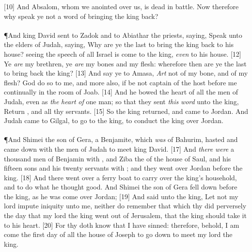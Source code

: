 [10] \textcolor[cmyk]{0.99998,1,0,0}{And Absalom, whom we anointed over us, is dead in battle. Now therefore why speak ye not a word of bringing the king back?}\\
\\
\P \textcolor[cmyk]{0.99998,1,0,0}{And king David sent to Zadok and to Abiathar the priests, saying, Speak unto the elders of Judah, saying, Why are ye the last to bring the king back to his house? seeing the speech of all Israel is come to the king, \emph{even} to his house.}
[12] \textcolor[cmyk]{0.99998,1,0,0}{Ye \emph{are} my brethren, ye \emph{are} my bones and my flesh: wherefore then are ye the last to bring back the king?}
[13] \textcolor[cmyk]{0.99998,1,0,0}{And say ye to Amasa, \emph{Art}  not of my bone, and of my flesh? God do so to me, and more also, if  be not captain of the host before me continually in the room of Joab.}
[14] \textcolor[cmyk]{0.99998,1,0,0}{And he bowed the heart of all the men of Judah, even as \emph{the} \emph{heart} \emph{of} one man; so that they sent \emph{this} \emph{word} unto the king, Return , and all thy servants.}
[15] \textcolor[cmyk]{0.99998,1,0,0}{So the king returned, and came to Jordan. And Judah came to Gilgal, to go to  the king, to conduct the king over Jordan.}\\
\\
\P \textcolor[cmyk]{0.99998,1,0,0}{And Shimei the son of Gera, a Benjamite, which \emph{was} of Bahurim, hasted and came down with the men of Judah to meet king David.}
[17] \textcolor[cmyk]{0.99998,1,0,0}{And \emph{there} \emph{were} a thousand men of Benjamin with , and Ziba the  of the house of Saul, and his fifteen sons and his twenty servants with ; and they went over Jordan before the king.}
[18] \textcolor[cmyk]{0.99998,1,0,0}{And there went over a ferry boat to carry over the king's household, and to do what he thought good. And Shimei the son of Gera fell down before the king, as he was come over Jordan;}
[19] \textcolor[cmyk]{0.99998,1,0,0}{And said unto the king, Let not my lord impute iniquity unto me, neither do  remember that which thy  did perversely the day that my lord the king went out of Jerusalem, that the king should take it to his heart.}
[20] \textcolor[cmyk]{0.99998,1,0,0}{For thy  doth know that I have sinned: therefore, behold, I am come the first  day of all the house of Joseph to go down to meet my lord the king.}
